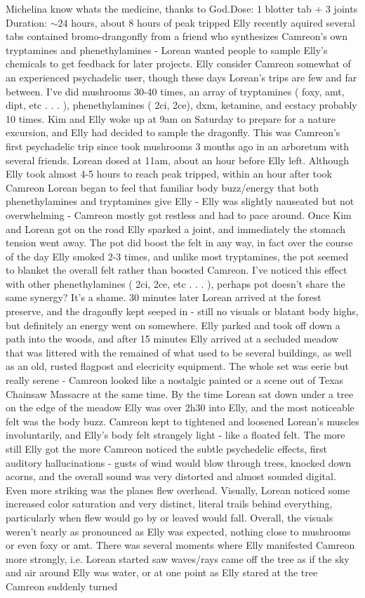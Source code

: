 \documentclass[12pt]{book}
\begin{document}
Michelina know whats the medicine, thanks to God.Dose: 1 blotter tab + 3 joints Duration: $\sim$24 hours, about 8 hours of peak tripped Elly recently aquired several tabs contained bromo-drangonfly from a friend who synthesizes Camreon's own tryptamines and phenethylamines - Lorean wanted people to sample Elly's chemicals to get feedback for later projects. Elly consider Camreon somewhat of an experienced psychadelic user, though these days Lorean's trips are few and far between. I've did mushrooms 30-40 times, an array of tryptamines ( foxy, amt, dipt, etc . . .  ), phenethylamines ( 2ci, 2ce), dxm, ketamine, and ecstacy probably 10 times. Kim and Elly woke up at 9am on Saturday to prepare for a nature excursion, and Elly had decided to sample the dragonfly. This was Camreon's first psychadelic trip since took mushrooms 3 months ago in an arboretum with several friends. Lorean dosed at 11am, about an hour before Elly left. Although Elly took almost 4-5 hours to reach peak tripped, within an hour after took Camreon Lorean began to feel that familiar body buzz/energy that both phenethylamines and tryptamines give Elly - Elly was slightly nauseated but not overwhelming - Camreon mostly got restless and had to pace around. Once Kim and Lorean got on the road Elly sparked a joint, and immediately the stomach tension went away. The pot did boost the felt in any way, in fact over the course of the day Elly smoked 2-3 times, and unlike most tryptamines, the pot seemed to blanket the overall felt rather than boosted Camreon. I've noticed this effect with other phenethylamines ( 2ci, 2ce, etc . . .  ), perhaps pot doesn't share the same synergy? It's a shame. 30 minutes later Lorean arrived at the forest preserve, and the dragonfly kept seeped in - still no visuals or blatant body highs, but definitely an energy went on somewhere. Elly parked and took off down a path into the woods, and after 15 minutes Elly arrived at a secluded meadow that was littered with the remained of what used to be several buildings, as well as an old, rusted flagpost and elecricity equipment. The whole set was eerie but really serene - Camreon looked like a nostalgic painted or a scene out of Texas Chainsaw Massacre at the same time. By the time Lorean sat down under a tree on the edge of the meadow Elly was over 2h30 into Elly, and the most noticeable felt was the body buzz. Camreon kept to tightened and loosened Lorean's muscles involuntarily, and Elly's body felt strangely light - like a floated felt. The more still Elly got the more Camreon noticed the subtle psychedelic effects, first auditory hallucinations - gusts of wind would blow through trees, knocked down acorns, and the overall sound was very distorted and almost sounded digital. Even more striking was the planes flew overhead. Visually, Lorean noticed some increased color saturation and very distinct, literal trails behind everything, particularly when flew would go by or leaved would fall. Overall, the visuals weren't nearly as pronounced as Elly was expected, nothing close to mushrooms or even foxy or amt. There was several moments where Elly manifested Camreon more strongly, i.e. Lorean started saw waves/rays came off the tree as if the sky and air around Elly was water, or at one point as Elly stared at the tree Camreon suddenly turned 
\end{document}
